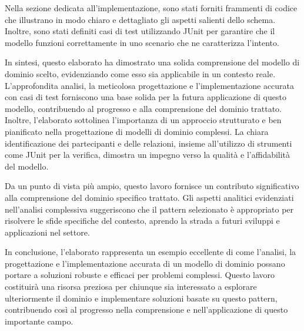 \documentclass{article}
\begin{document}
\begin{sloppy}
\bigbreak

Nella sezione dedicata all'implementazione, sono stati forniti frammenti di codice che illustrano in modo chiaro e dettagliato gli aspetti salienti dello schema. Inoltre, sono stati definiti casi di test utilizzando JUnit per garantire che il modello funzioni correttamente in uno scenario che ne caratterizza l'intento.

\bigbreak

In sintesi, questo elaborato ha dimostrato una solida comprensione del modello di dominio scelto, evidenziando come esso sia applicabile in un contesto reale. L'approfondita analisi, la meticolosa progettazione e l'implementazione accurata con casi di test forniscono una base solida per la futura applicazione di questo modello, contribuendo al progresso e alla comprensione del dominio trattato. Inoltre, l'elaborato sottolinea l'importanza di un approccio strutturato e ben pianificato nella progettazione di modelli di dominio complessi. La chiara identificazione dei partecipanti e delle relazioni, insieme all'utilizzo di strumenti come JUnit per la verifica, dimostra un impegno verso la qualità e l'affidabilità del modello.

\bigbreak

Da un punto di vista più ampio, questo lavoro fornisce un contributo significativo alla comprensione del dominio specifico trattato. Gli aspetti analitici evidenziati nell'analisi complessiva suggeriscono che il pattern selezionato è appropriato per risolvere le sfide specifiche del contesto, aprendo la strada a futuri sviluppi e applicazioni nel settore.

\bigbreak

In conclusione, l'elaborato rappresenta un esempio eccellente di come l'analisi, la progettazione e l'implementazione accurata di un modello di dominio possano portare a soluzioni robuste e efficaci per problemi complessi. Questo lavoro costituirà una risorsa preziosa per chiunque sia interessato a esplorare ulteriormente il dominio e implementare soluzioni basate su questo pattern, contribuendo così al progresso nella comprensione e nell'applicazione di questo importante campo.

\end{sloppy}
\end{document}
